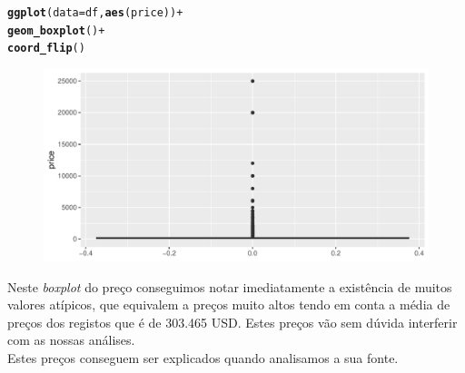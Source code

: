 \documentclass[justified, 11pt]{scrartcl}\usepackage[]{graphicx}\usepackage[]{xcolor}
\makeatletter
\def\maxwidth{ %
  \ifdim\Gin@nat@width>\linewidth
    \linewidth
  \else
    \Gin@nat@width
  \fi
}
\newcommand{\hlopt}[1]{\textcolor[rgb]{0,0,0}{#1}}%
\newcommand{\hlstd}[1]{\textcolor[rgb]{0.345,0.345,0.345}{#1}}%
\newcommand{\hlkwc}[1]{\textcolor[rgb]{0.333,0.667,0.333}{#1}}%
\newcommand{\hlkwd}[1]{\textcolor[rgb]{0.737,0.353,0.396}{\textbf{#1}}}%
\newenvironment{kframe}{%
 \def\at@end@of@kframe{}%
 \ifinner\ifhmode%
  \def\at@end@of@kframe{\end{minipage}}%
  \begin{minipage}{\columnwidth}%
 \fi\fi%
 \def\FrameCommand##1{\hskip\@totalleftmargin \hskip-\fboxsep
 \colorbox{shadecolor}{##1}\hskip-\fboxsep
     \hskip-\linewidth \hskip-\@totalleftmargin \hskip\columnwidth}%
 \MakeFramed {\advance\hsize-\width
   \@totalleftmargin\z@ \linewidth\hsize
   \@setminipage}}%
 {\par\unskip\endMakeFramed%
 \at@end@of@kframe}
\newenvironment{knitrout}{}{} %
\makeatother
\begin{document}
\begin{knitrout}
\color{fgcolor}\begin{kframe}
\begin{alltt}
\hlkwd{ggplot}\hlstd{(}\hlkwc{data}\hlstd{=df,} \hlkwd{aes}\hlstd{(price))} \hlopt{+}
  \hlkwd{geom_boxplot}\hlstd{()} \hlopt{+}
  \hlkwd{coord_flip}\hlstd{()}
\end{alltt}
\end{kframe}\begin{figure}
\includegraphics[width=\maxwidth]{figure/chunk-priceBoxPlot-1} \end{figure}

\end{knitrout}
Neste \textit{boxplot} do preço conseguimos notar imediatamente a existência de muitos valores atípicos, que equivalem a preços muito altos tendo em conta a média de preços dos registos que é de 303.465 USD. Estes preços vão sem dúvida interferir com as nossas análises. \\
Estes preços conseguem ser explicados quando analisamos a sua fonte.
\end{document}
